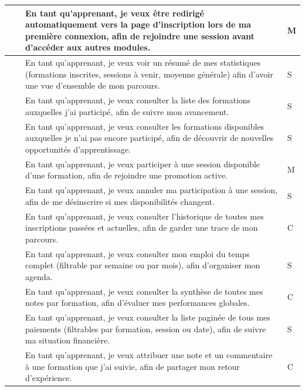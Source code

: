 {\begin{longtable}{|>{\centering\arraybackslash}p{1cm}|>{\centering\arraybackslash}p{4cm}|p{10cm}|>{\centering\arraybackslash}p{1.5cm}|}
\multirow{11}{=}{\centering\textbf{4}} & \multirow{11}{=}{\centering\textbf{Espace apprenant}}
& En tant qu'apprenant, je veux être redirigé automatiquement vers la page d'inscription lors de ma première connexion, afin de rejoindre une session avant d'accéder aux autres modules. & M \\
\cline{3-4}
& & En tant qu'apprenant, je veux voir un résumé de mes statistiques (formations inscrites, sessions à venir, moyenne générale) afin d'avoir une vue d'ensemble de mon parcours. & S \\
\cline{3-4}
& & En tant qu'apprenant, je veux consulter la liste des formations auxquelles j'ai participé, afin de suivre mon avancement. & S \\
\cline{3-4}
& & En tant qu'apprenant, je veux consulter les formations disponibles auxquelles je n'ai pas encore participé, afin de découvrir de nouvelles opportunités d'apprentissage. & S \\
\cline{3-4}
& & En tant qu'apprenant, je veux participer à une session disponible d'une formation, afin de rejoindre une promotion active. & M \\
\cline{3-4}
& & En tant qu'apprenant, je veux annuler ma participation à une session, afin de me désinscrire si mes disponibilités changent. & S \\
\cline{3-4}
& & En tant qu'apprenant, je veux consulter l'historique de toutes mes inscriptions passées et actuelles, afin de garder une trace de mon parcours. & C \\
\cline{3-4}
& & En tant qu'apprenant, je veux consulter mon emploi du temps complet (filtrable par semaine ou par mois), afin d'organiser mon agenda. & S \\
\cline{3-4}
& & En tant qu'apprenant, je veux consulter la synthèse de toutes mes notes par formation, afin d'évaluer mes performances globales. & C \\
\cline{3-4}
& & En tant qu'apprenant, je veux consulter la liste paginée de tous mes paiements (filtrables par formation, session ou date), afin de suivre ma situation financière. & S \\
\cline{3-4}
& & En tant qu'apprenant, je veux attribuer une note et un commentaire à une formation que j'ai suivie, afin de partager mon retour d'expérience. & C \\
\hline


\end{longtable}}
